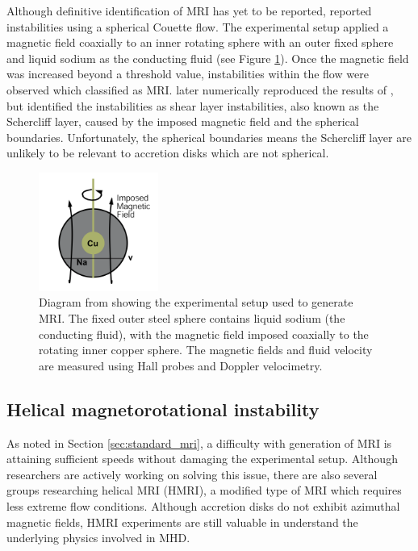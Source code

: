 \documentclass{jfm}
\begin{document}
Although definitive identification of MRI has yet to be reported,
\cite{Sisan2004} reported instabilities using a spherical Couette flow. The
experimental setup applied a magnetic field coaxially to an inner rotating
sphere with an outer fixed sphere and liquid sodium as the conducting fluid
(see Figure \ref{fig:diagram_Sisan}).  Once the magnetic field was increased
beyond a threshold value, instabilities within the flow were observed which
\cite{Sisan2004} classified as MRI.  \cite{Gissinger2011} later numerically
reproduced the results of \cite{Sisan2004}, but identified the instabilities as
shear layer instabilities, also known as the Schercliff layer, caused by the
imposed magnetic field and the spherical boundaries.  Unfortunately, the
spherical boundaries means the Schercliff layer are unlikely to be relevant to
accretion disks which are not spherical.

\begin{figure}
    \centering
    \includegraphics[width=0.35\textwidth]{Sisan2004_diagram}
    \caption{Diagram from \cite{Sisan2004} showing the experimental setup used to generate MRI. The fixed outer steel sphere contains liquid sodium (the conducting fluid), with the magnetic field imposed coaxially to the rotating inner copper sphere. The magnetic fields and fluid velocity are measured using Hall probes and Doppler velocimetry.}
    \label{fig:diagram_Sisan}
\end{figure}



%
%
\subsection{Helical magnetorotational instability}

As noted in Section \ref{sec:standard_mri}, a difficulty with generation of
MRI is attaining sufficient speeds without damaging the experimental setup. 
Although researchers are actively working on solving this issue, there are also
several groups researching helical MRI (HMRI), a modified type of MRI which requires 
less extreme flow conditions. Although accretion disks do not exhibit azimuthal
magnetic fields, HMRI experiments are still valuable in understand the underlying
physics involved in MHD.
\end{document}
